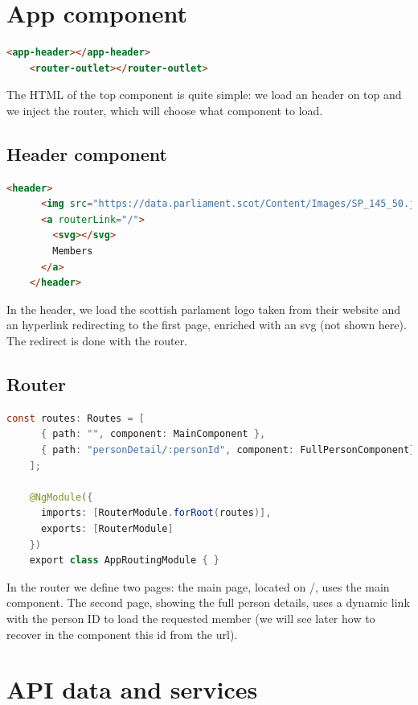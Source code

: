 \documentclass[12pt, a4paper]{article}
\begin{document}
  \pagebreak
  \section{App component}
  \begin{lstlisting}[language=html, caption={App component html}]
    <app-header></app-header>
    <router-outlet></router-outlet>\end{lstlisting}

  The HTML of the top component is quite simple: we load an header on top and we inject the router, which will choose what component to load.

  \subsection{Header component}

  \begin{lstlisting}[language=html, caption={Header component constructor}]
    <header>
      <img src="https://data.parliament.scot/Content/Images/SP_145_50.jpg" />
      <a routerLink="/">
        <svg></svg>    
        Members
      </a>
    </header>\end{lstlisting}
  
  In the header, we load the scottish parlament logo taken from their website and an hyperlink redirecting to the first page, enriched with an svg (not shown here). The redirect is done with the router.

  \subsection{Router}
  \begin{lstlisting}[language=java, caption={Router component module}]
    const routes: Routes = [
      { path: "", component: MainComponent },
      { path: "personDetail/:personId", component: FullPersonComponent}
    ];

    @NgModule({
      imports: [RouterModule.forRoot(routes)],
      exports: [RouterModule]
    })
    export class AppRoutingModule { }\end{lstlisting}

  In the router we define two pages: the main page, located on /, uses the main component. The second page, showing the full person details, uses a dynamic link with the person ID to load the requested member (we will see later how to recover in the component this id from the url).

  \pagebreak
  \section{API data and services}
\end{document}
